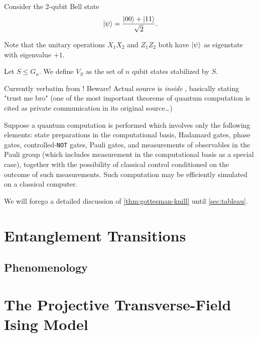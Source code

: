 Consider the 2-qubit Bell state
\begin{align}
  \ket{\psi} = \frac{\ket{00} + \ket{11}}{\sqrt{2}} 
.\end{align}

Note that the unitary operations $X_1 X_2$ and $Z_1 Z_2$ both have $\ket{\psi}$
as eigenstate with eigenvalue $+1$.


\begin{defn}
  Let $S\leq G_n$. We define $V_S$ as the set of $n$ qubit states stabilized by
  $S$.
\end{defn}

Currently verbatim from \cite{nielsenQuantumComputationQuantum2010}! Beware!
Actual source is \emph{inside}
\cite{gottesmanHeisenbergRepresentationQuantum1998}, basically stating "trust
me bro" (one of the most important theorems of quantum computation is cited as
private communication in its original source\ldots)
\begin{thm}\label{thm:gottesman-knill}
  Suppose a quantum computation is performed which involves only the following
  elements: state preparations in the computational basis, Hadamard gates,
  phase gates, controlled-\verb|NOT| gates, Pauli gates, and measurements of
  observables in the Pauli group (which includes measurement in the
  computational basis as a special case), together with the possibility of
  classical control conditioned on the outcome of such measurements. Such
  computation may be efficiently simulated on a classical computer.
\end{thm}
We will forego a detailed discussion of \cref{thm:gottesman-knill} until
\cref{sec:tableau}. 

\section{Entanglement Transitions}\label{sec:ent-trans}

\subsection{Phenomenology}

\section{The Projective Transverse-Field Ising Model}

